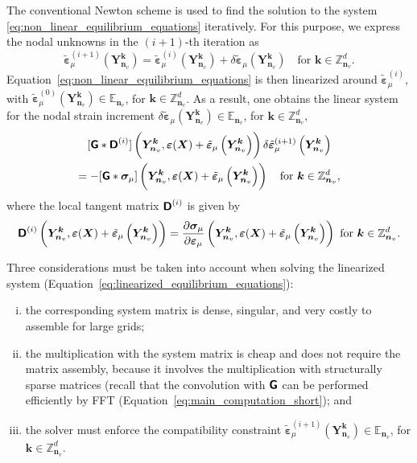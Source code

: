 The conventional Newton scheme is used to find the solution to the system \eqref{eq:non_linear_equilibrium_equations} iteratively. For this purpose, we express the nodal unknowns in the \((i+1)\)-th iteration as
\begin{equation}
\tilde{\bm\varepsilon}_{\mu}^{(i+1)}\left(\bm{Y}_{\bm n_v}^{\bm  k}\right) =\tilde{\bm\varepsilon}_{\mu}^{(i)}\left(\bm{Y}_{\bm n_v}^{\bm  k}\right)+\delta \tilde{\bm\varepsilon}_{\mu}\left(\bm{Y}_{\bm n_v}^{\bm  k}\right)\quad \text{for \(\bm k \in \mathbb Z^d_{\bm n_v}\)}.
\end{equation}
Equation~\eqref{eq:non_linear_equilibrium_equations} is then linearized around \(\tilde{\bm\varepsilon}_\mu^{(i)}\), with \(\tilde{\bm\varepsilon}_\mu^{(0)}\left(\bm{Y}_{\bm n_v}^{\bm  k}\right) \in \mathbb{E}_{\bm n_v}\), for \(\bm k\in \mathbb Z^{d}_{\bm n_v}\).
As a result, one obtains the linear system for the nodal strain increment \(\delta \tilde{\bm\varepsilon}_\mu\left(\bm{Y}_{\bm n_v}^{\bm  k}\right) \in \mathbb{E}_{\bm n_v}\), for \(\bm k\in \mathbb Z^{d}_{\bm n_v}\),
\begin{multline} \label{eq:linearized_equilibrium_equations}
[\boldsymbol{\mathsf{G}} * \boldsymbol{\mathsf{D}}^{(i)}]\left(\bm{Y}_{\bm n_v}^{\bm  k}, \bm \varepsilon(\bm X)+\tilde{\bm \varepsilon}_\mu \left(\bm Y_{\bm n_v}^{\bm  k}\right)\right)\delta \tilde{\bm\varepsilon}_{\mu}^{(i+1)}\left(\bm{Y}_{\bm n_v}^{\bm  k}\right)\\ = -[\boldsymbol{\mathsf{G}} * \bm\sigma_\mu]\left(\bm{Y}_{\bm n_v}^{\bm  k}, \bm \varepsilon(\bm X)+\tilde{\bm \varepsilon}_\mu \left(\bm Y_{\bm n_v}^{\bm  k}\right)\right)\quad \text{for \(\bm k \in \mathbb Z^d_{\bm n_v}\)},
\end{multline}
where the local tangent matrix \(\boldsymbol{\mathsf{D}}^{(i)}\) is given by
\begin{equation}
\boldsymbol{\mathsf{D}}^{(i)}\left(\bm{Y}_{\bm n_v}^{\bm  k}, \bm \varepsilon(\bm X)+\tilde{\bm \varepsilon}_\mu \left(\bm Y_{\bm n_v}^{\bm  k}\right)\right)=\frac{\partial \bm{\sigma}_\mu}{\partial \bm \varepsilon_\mu}\left(\bm{Y}_{\bm n_v}^{\bm  k}, \bm \varepsilon(\bm X)+\tilde{\bm \varepsilon}_\mu \left(\bm Y_{\bm n_v}^{\bm  k}\right)\right) \text { for } \bm  k \in \mathbb{Z}_{\bm n_v}^{d}.
\end{equation}

Three considerations must be taken into account when solving the linearized system (Equation~\eqref{eq:linearized_equilibrium_equations}):
\begin{enumerate}[(i)]
  \item the corresponding system matrix is dense, singular, and very costly to assemble for large grids;
  \item the multiplication with the system matrix is cheap and does not require the matrix assembly, because it involves the multiplication with structurally sparse matrices (recall that the convolution with \(\boldsymbol{\mathsf{G}}\) can be performed efficiently by FFT (Equation~\eqref{eq:main_computation_short}); and
  \item the solver must enforce the compatibility constraint \(\tilde{\bm \varepsilon}_\mu^{(i+1)}\left(\bm{Y}_{\bm n_v}^{\bm  k}\right) \in \mathbb{E}_{\bm n_v}\), for \(\bm k\in \mathbb Z^{d}_{\bm n_v}\).
\end{enumerate}

